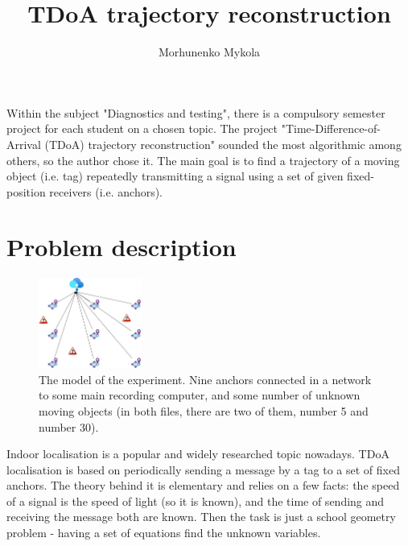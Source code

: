 \documentclass[journal]{IEEEtran}
\begin{document}
\title{TDoA trajectory reconstruction}
\author{Morhunenko Mykola}
\maketitle

Within the subject "Diagnostics and testing", there is a compulsory semester project for each student on a chosen topic.
The project "Time-Difference-of-Arrival (TDoA) trajectory reconstruction" sounded the most algorithmic among others, so the author chose it.
The main goal is to find a trajectory of a moving object (i.e. tag) repeatedly transmitting a signal using a set of given fixed-position receivers (i.e. anchors).

\section{Problem description}
\label{sec:problem}

\begin{figure}[ht]
    \centering
    \includegraphics[width=0.30\textwidth]{graphics/scheme.jpg}
    \caption{The model of the experiment. Nine anchors connected in a network to some main recording computer, and some number of unknown moving objects (in both files, there are two of them, number 5 and number 30).}
    \label{fig:time}
\end{figure}

Indoor localisation is a popular and widely researched topic nowadays.
TDoA localisation is based on periodically sending a message by a tag to a set of fixed anchors. 
The theory behind it is elementary and relies on a few facts: the speed of a signal is the speed of light (so it is known), and the time of sending and receiving the message both are known.
Then the task is just a school geometry problem - having a set of equations find the unknown variables.
\end{document}
